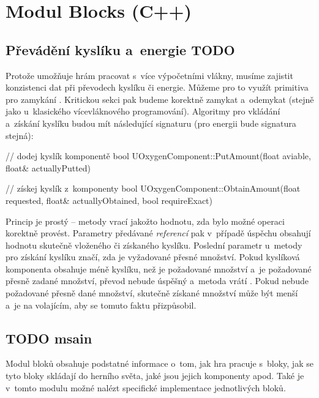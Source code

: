
\section{Modul Blocks (C++)}



\subsection{Převádění kyslíku a~energie TODO}
Protože \UE{} umožňuje hrám pracovat s~více výpočetními vlákny, musíme zajistit konzistenci dat při převodech kyslíku či energie. Můžeme pro to využít primitiva pro zamykání . Kritickou sekci pak budeme korektně zamykat a~odemykat (stejně jako u~klasického vícevláknového programování). Algoritmy pro vkládání a~získání kyslíku budou mít následující signaturu (pro energii bude signatura stejná):

\begin{code}
    // dodej kyslík komponentě
    bool UOxygenComponent::PutAmount(float aviable,
                                     float& actuallyPutted)

    // získej kyslík z~komponenty                                     
    bool UOxygenComponent::ObtainAmount(float requested,
                                        float& actuallyObtained,
                                        bool requireExact)
\end{code}


Princip je prostý -- metody vrací  jakožto hodnotu, zda bylo možné operaci korektně provést. Parametry předávané \textit{referencí} pak v~případě úspěchu obsahují hodnotu skutečně vloženého či získaného kyslíku. Poslední parametr u~metody pro získání kyslíku značí, zda je vyžadované přesné množství. Pokud kyslíková komponenta obsahuje méně kyslíku, než je požadované množství a~je požadované přesně zadané množství, převod nebude úspěšný a~metoda vrátí . Pokud nebude požadované přesně dané množství, skutečně získané množství může být menší a~je na volajícím, aby se tomuto faktu přizpůsobil.


\subsection{TODO msain}

Modul bloků obsahuje podstatné informace o~tom, jak hra pracuje s~bloky, jak se tyto bloky skládají do herního světa, jaké jsou jejich komponenty apod. Také je v~tomto modulu možné nalézt specifické implementace jednotlivých bloků.

